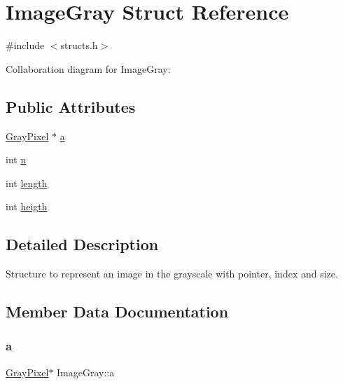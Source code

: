 \hypertarget{structImageGray}{}\section{Image\+Gray Struct Reference}
\label{structImageGray}


{\ttfamily \#include $<$structs.\+h$>$}



Collaboration diagram for Image\+Gray\+:
\subsection*{Public Attributes}
\begin{DoxyCompactItemize}
\item 
\hyperlink{structGrayPixel}{Gray\+Pixel} $\ast$ \hyperlink{structImageGray_ad57f89f53c6ca2175dc2dfcc081c56b0}{a}
\item 
int \hyperlink{structImageGray_a2191428ee36edaee985387a6f25f0643}{n}
\item 
int \hyperlink{structImageGray_a8b7307978071511731a34a2a011efddd}{length}
\item 
int \hyperlink{structImageGray_ab21f876eabd63b8536223a18f1bac2cd}{heigth}
\end{DoxyCompactItemize}


\subsection{Detailed Description}
Structure to represent an image in the grayscale with pointer, index and size. 

\subsection{Member Data Documentation}
\mbox{\label{structImageGray_ad57f89f53c6ca2175dc2dfcc081c56b0}} 
\subsubsection{\texorpdfstring{a}{a}}
{\footnotesize\ttfamily \hyperlink{structGrayPixel}{Gray\+Pixel}$\ast$ Image\+Gray\+::a}

\mbox{\label{structImageGray_ab21f876eabd63b8536223a18f1bac2cd}} 
